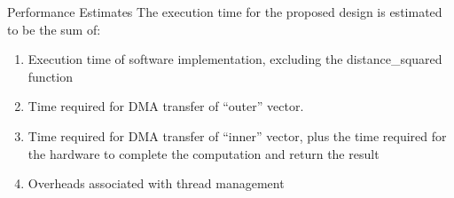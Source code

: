 \begin{frame}[label=performance-estimates]{Performance Estimates}
    The execution time for the proposed design is estimated to be the sum of:
    \begin{enumerate}
        \item<1-> Execution time of software implementation, excluding the
            distance\_squared function
        \item<2-> Time required for DMA transfer of ``outer'' vector.
        \item<3-> Time required for DMA transfer of ``inner'' vector, plus the time
            required for the hardware to complete the computation and return the
            result
        \item<4-> Overheads associated with thread management
    \end{enumerate}
\end{frame}
